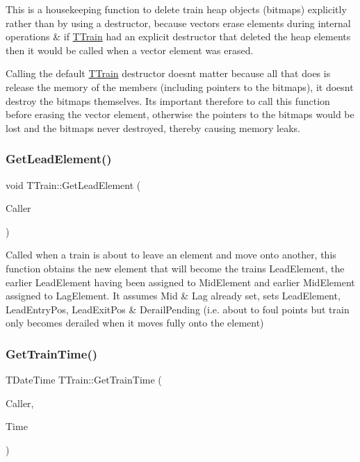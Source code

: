 This is a housekeeping function to delete train heap objects (bitmaps) explicitly rather than by using a destructor, because vectors erase elements during internal operations \& if \mbox{\hyperlink{class_t_train}{T\+Train}} had an explicit destructor that deleted the heap elements then it would be called when a vector element was erased.

Calling the default \mbox{\hyperlink{class_t_train}{T\+Train}} destructor doesn\textquotesingle{}t matter because all that does is release the memory of the members (including pointers to the bitmaps), it doesn\textquotesingle{}t destroy the bitmaps themselves. It\textquotesingle{}s important therefore to call this function before erasing the vector element, otherwise the pointers to the bitmaps would be lost and the bitmaps never destroyed, thereby causing memory leaks. \mbox{\label{class_t_train_a0675ea1dede706d5b0dd52264496865a}} 
\subsubsection{\texorpdfstring{Get\+Lead\+Element()}{GetLeadElement()}}
{\footnotesize\ttfamily void T\+Train\+::\+Get\+Lead\+Element (\begin{DoxyParamCaption}\item[{int}]{Caller }\end{DoxyParamCaption})\hspace{0.3cm}{\ttfamily [private]}}

Called when a train is about to leave an element and move onto another, this function obtains the new element that will become the train\textquotesingle{}s Lead\+Element, the earlier Lead\+Element having been assigned to Mid\+Element and earlier Mid\+Element assigned to Lag\+Element. It assumes Mid \& Lag already set, sets Lead\+Element, Lead\+Entry\+Pos, Lead\+Exit\+Pos \& Derail\+Pending (i.\+e. about to foul points but train only becomes derailed when it moves fully onto the element) \mbox{\label{class_t_train_ad249f34f6862e604b8e141d1b25fe57d}} 
\subsubsection{\texorpdfstring{Get\+Train\+Time()}{GetTrainTime()}}
{\footnotesize\ttfamily T\+Date\+Time T\+Train\+::\+Get\+Train\+Time (\begin{DoxyParamCaption}\item[{int}]{Caller,  }\item[{T\+Date\+Time}]{Time }\end{DoxyParamCaption})\hspace{0.3cm}{\ttfamily [private]}}

